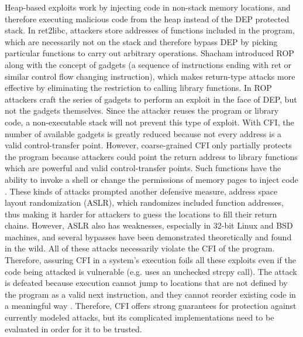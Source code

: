 \documentclass[letterpaper,10pt]{article}
\begin{document}
\newline
\indent Heap-based exploits work by injecting code in non-stack memory locations, and therefore executing malicious code from the heap instead of the DEP protected stack\cite{Foster}. In ret2libc, attackers store addresses of functions included in the program, which are necessarily not on the stack and therefore bypass DEP by picking particular functions to carry out arbitrary operations\cite{SolarDesigner}.
\newline
\indent Shacham introduced ROP along with the concept of gadgets (a sequence of instructions ending with ret or similar control flow changing instruction), which makes return-type attacks more effective by eliminating the restriction to calling library functions\cite{Shacham:2007}. In ROP attackers craft the series of gadgets to perform an exploit in the face of DEP, but not the gadgets themselves\cite{goktas}. Since the attacker reuses the program or library code, a non-executable stack will not prevent this type of exploit. With CFI, the number of available gadgets is greatly reduced because not every address is a valid control-transfer point. However, coarse-grained CFI only partially protects the program because attackers could point the return address to library functions which are powerful and valid control-transfer points\cite{carlini}. Such functions have the ability to invoke a shell or change the permissions of memory pages to inject code \cite{goktas}.
\newline
\indent These kinds of attacks prompted another defensive measure, address space layout randomization (ASLR), which randomizes included function addresses, thus making it harder for attackers to guess the locations to fill their return chains. However, ASLR also has weaknesses, especially in 32-bit Linux and BSD machines\cite{Shacham:2004}, and several bypasses have been demonstrated theoretically and found in the wild\cite{Wang, Chen}.
\newline
\indent All of these attacks necessarily violate the CFI of the program. Therefore, assuring CFI in a system's execution foils all these exploits even if the code being attacked is vulnerable (e.g. uses an unchecked strcpy call). The attack is defeated because execution cannot jump to locations that are not defined by the program as a valid next instruction, and they cannot reorder existing code in a meaningful way \cite{abadi}. Therefore, CFI offers strong guarantees for protection against currently modeled attacks, but its complicated implementations need to be evaluated in order for it to be trusted.
\end{document}
